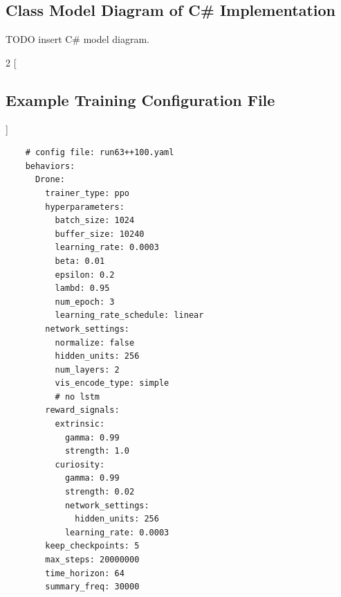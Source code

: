 \newpage

\subsection{Class Model Diagram of C\# Implementation}

TODO insert C# model diagram.



\newpage
\begin{multicols}{2}
[
\subsection{Example Training Configuration File}\label{appendix:ppo-trainer}
]
\begin{verbatim}
    # config file: run63++100.yaml
    behaviors:
      Drone:
        trainer_type: ppo
        hyperparameters:
          batch_size: 1024
          buffer_size: 10240
          learning_rate: 0.0003
          beta: 0.01
          epsilon: 0.2
          lambd: 0.95
          num_epoch: 3
          learning_rate_schedule: linear
        network_settings:
          normalize: false
          hidden_units: 256
          num_layers: 2
          vis_encode_type: simple
          # no lstm
        reward_signals:
          extrinsic:
            gamma: 0.99
            strength: 1.0
          curiosity:
            gamma: 0.99
            strength: 0.02
            network_settings:
              hidden_units: 256
            learning_rate: 0.0003
        keep_checkpoints: 5
        max_steps: 20000000
        time_horizon: 64
        summary_freq: 30000
\end{verbatim}
\columnbreak


\end{multicols}
